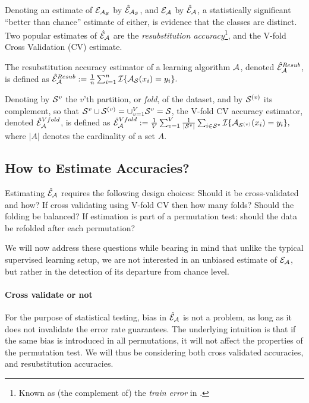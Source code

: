 \documentclass[onecolumn,draftclsnofoot]{IEEEtran}
\begin{document}
Denoting an estimate of $\mathcal{E}_{\mathcal{A}_{\mathcal{S}}}$ by $\hat{\mathcal{E}}_{\mathcal{A}_{\mathcal{S}}}$, and $\mathcal{E}_{\mathcal{A}}$ by $\hat{\mathcal{E}}_{\mathcal{A}}$, a statistically significant ``better than chance'' estimate of either, is evidence that the classes are distinct. 
Two popular estimates of $\hat{\mathcal{E}}_{\mathcal{A}}$ are the \emph{resubstitution accuracy}\footnote{Known as (the complement of) the \emph{train error} in \cite{hastie_elements_2003}.}, and the V-fold Cross Validation (CV) estimate.
\begin{definition}
	\label{def:resubstitution}
	The resubstitution accuracy estimator of a learning algorithm $\mathcal{A}$, denoted $\hat{\mathcal{E}}_{\mathcal{A}}^{Resub}$,  is defined as
$\hat{\mathcal{E}}_{\mathcal{A}}^{Resub} := \frac 1n \sum_{i=1}^{n} \mathcal{I}{\{ \mathcal{A}_{\mathcal{S}}(x_i)=y_i \}}.$
\end{definition}


\begin{definition}
	\label{def:v-fold}
	Denoting by $\mathcal{S}^{v}$ the $v$'th partition, or \emph{fold}, of the dataset, and by $\mathcal{S}^{(v)}$ its complement, so that $\mathcal{S}^{v} \cup \mathcal{S}^{(v)}=\cup_{v=1}^V \mathcal{S}^{v}=\mathcal{S}$, the V-fold CV accuracy estimator, denoted $\hat{\mathcal{E}}_{\mathcal{A}}^{Vfold}$, is defined as 	
$\hat{\mathcal{E}}_{\mathcal{A}}^{Vfold} := 
	\frac 1V \sum_{v=1}^{V} \frac{1}{|\mathcal{S}^v|} \sum_{i \in \mathcal{S}^{v}} \mathcal{I}{\{ \mathcal{A}_{\mathcal{S}^{(v)}}(x_i)=y_i \}},$
	where $|A|$ denotes the cardinality of a set $A$.
\end{definition}




\subsection{How to Estimate Accuracies?}
\label{sec:considerations}

Estimating $\hat{\mathcal{E}}_{\mathcal{A}}$ requires the following design choices: 
Should it be cross-validated and how? 
If cross validating using V-fold CV then how many folds? 
Should the folding be balanced?
If estimation is part of a permutation test: should the data be refolded after each permutation? 

We will now address these questions while bearing in mind that unlike the typical supervised learning setup, we are not interested in an unbiased estimate of $\mathcal{E}_{\mathcal{A}}$, but rather in the detection of its departure from chance level. 

\paragraph{Cross validate or not}
For the purpose of statistical testing, bias in $\hat{\mathcal{E}}_{\mathcal{A}}$ is not a problem, as long as it does not invalidate the error rate guarantees. 
The underlying intuition is that if the same bias is introduced in all permutations, it will not affect the properties of the permutation test. 
We will thus be considering both cross validated accuracies, and resubstitution accuracies.
\end{document}
